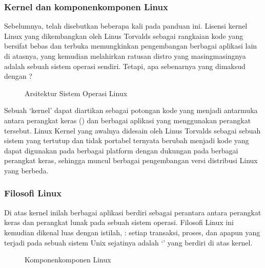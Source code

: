 \documentclass[letterpaper,10pt,english]{sphinxmanual}
\begin{document}
\subsubsection{Kernel dan komponen\sphinxhyphen{}komponen Linux}
\label{\detokenize{sesi1/arsitektur:kernel-dan-komponen-komponen-linux}}
Sebelumnya, {\hyperref[\detokenize{sesi1/arsitektur:kernel}]{}} telah disebutkan beberapa kali pada panduan ini. Lisensi kernel Linux yang dikembangkan oleh Linus Torvalds sebagai rangkaian kode yang bersifat bebas dan terbuka memungkinkan pengembangan berbagai aplikasi lain di atasnya, yang kemudian melahirkan ratusan distro yang masing\sphinxhyphen{}masingnya adalah sebuah sistem operasi sendiri. Tetapi, apa sebenarnya yang dimaksud dengan ?

\begin{figure}[htbp]
\centering
\capstart

\noindent{}
\caption{Arsitektur Sistem Operasi Linux}\label{\detokenize{sesi1/arsitektur:kernel}}\end{figure}

Sebuah ‘kernel’ dapat diartikan sebagai potongan kode yang menjadi antarmuka antara perangkat keras () dan berbagai aplikasi yang menggunakan perangkat tersebut. Linux Kernel yang awalnya didesain oleh Linus Torvalds sebagai sebuah sistem yang tertutup dan tidak portabel ternyata berubah menjadi kode yang dapat digunakan pada berbagai platform dengan dukungan pada berbagai perangkat keras, sehingga muncul berbagai pengembangan versi distribusi Linux yang berbeda.


\subsubsection{Filosofi Linux}
\label{\detokenize{sesi1/arsitektur:filosofi-linux}}
Di atas kernel inilah berbagai aplikasi berdiri sebagai perantara antara perangkat keras dan perangkat lunak pada sebuah sistem operasi. Filosofi Linux ini kemudian dikenal luas dengan istilah, : setiap transaksi, proses, dan apapun yang terjadi pada sebuah sistem Unix sejatinya adalah ‘’ yang berdiri di atas kernel.

\begin{figure}[htbp]
\centering
\capstart

\noindent{}
\caption{Komponen\sphinxhyphen{}komponen Linux}\label{\detokenize{sesi1/arsitektur:komponen}}\end{figure}
\end{document}
